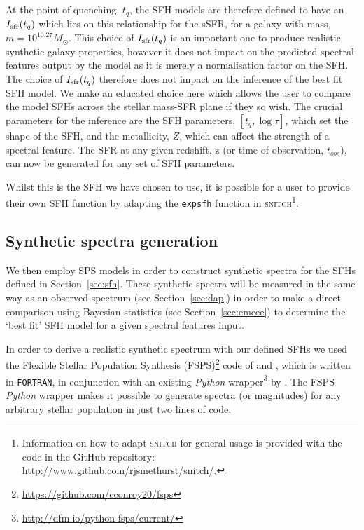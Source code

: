 \documentclass[useAMS,usenatbib]{mn2e}
\begin{document}
At the point of quenching, $t_{q}$, the SFH models are therefore defined to have an $I_{\rm{sfr}}(t_q)$ which lies on this relationship for the sSFR, for a galaxy with mass, $m = 10^{10.27} M_{\odot}$. This choice of $I_{\rm{sfr}}(t_q)$ is an important one to produce realistic synthetic galaxy properties, however it does not impact on the predicted spectral features output by the model as it is merely a normalisation factor on the SFH. The choice of $I_{\rm{sfr}}(t_q)$ therefore does not impact on the inference of the best fit SFH model. We make an educated choice here which allows the user to compare the model SFHs across the stellar mass-SFR plane if they so wish. The crucial parameters for the inference are the SFH parameters, $[t_q, \log \tau]$, which set the shape of the SFH, and the metallicity, $Z$, which can affect the strength of a spectral feature. The SFR at any given redshift, z (or time of observation, $t_{obs}$), can now be generated for any set of SFH parameters.

Whilst this is the SFH we have chosen to use, it is possible for a user to provide their own SFH function by adapting the \texttt{expsfh} function in \textsc{snitch}\footnote{\label{adapt}Information on how to adapt \textsc{snitch} for general usage is provided with the code in the GitHub repository: \url{http://www.github.com/rjsmethurst/snitch/}.}.


\subsection{Synthetic spectra generation}\label{sec:fsps}

We then employ SPS models in order to construct synthetic spectra for the SFHs defined in Section~\ref{sec:sfh}. These synthetic spectra will be measured in the same way as an observed spectrum (see Section~\ref{sec:dap}) in order to make a direct comparison using Bayesian statistics (see Section~\ref{sec:emcee}) to determine the `best fit' SFH model for a given spectral features input. 

In order to derive a realistic synthetic spectrum with our defined SFHs we used the Flexible Stellar Population Synthesis (FSPS)\footnote{\url{https://github.com/cconroy20/fsps}} code of \cite{conroy09} and \citet{conroy10}, which is written in \texttt{FORTRAN}, in conjunction with an existing \emph{Python} wrapper\footnote{\url{http://dfm.io/python-fsps/current/}} by \cite{python_fsps}. The FSPS \emph{Python} wrapper makes it possible to generate spectra (or magnitudes) for any arbitrary stellar population in just two lines of code.  
\end{document}
